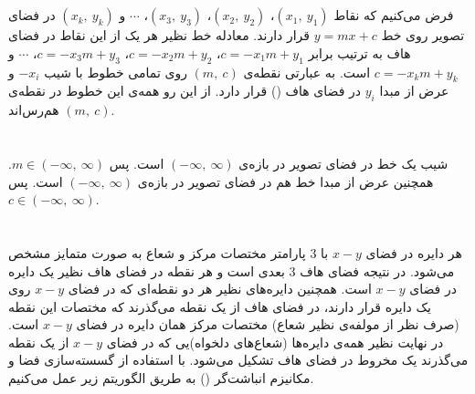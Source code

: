 \documentclass{article}
\begin{document}


\newpage


\section{}%
فرض می‌کنیم که نقاط 
$(x_{1},\: y_{1})$، 
$(x_{2},\: y_{2})$، 
$(x_{3},\: y_{3})$، 
$\cdots $ و 
$(x_{k},\: y_{k})$ در فضای تصویر روی خط 
$y=mx+c$
قرار دارند. معادله خط نظیر هر یک از این نقاط در فضای هاف به ترتیب برابر 
$c = -x_{1}m + y_{1}$، 
$c = -x_{2}m + y_{2}$، 
$c = -x_{3}m + y_{3}$، 
$\cdots $ و 
$c = -x_{k}m + y_{k}$ 
است. به عبارتی نقطه‌ی $(m,\:c)$ روی تمامی خطوط با شیب $-x_{i}$ و عرض از مبدا $y_{i}$ در فضای هاف () قرار دارد. از این رو همه‌ی این خطوط در نقطه‌ی $(m,\:c)$ هم‌رس‌اند.


\section{}%
شیب یک خط در فضای تصویر در بازه‌ی $\left( -\infty ,\: \infty \right)$ است. پس 
$
m \in \left( -\infty ,\: \infty \right)
$.
همچنین عرض از مبدا خط هم در فضای تصویر در بازه‌ی $\left( -\infty ,\: \infty \right)$ است. پس 
$
c \in \left( -\infty ,\: \infty \right)
$.


\section{}%
هر دایره در فضای $x-y$ با 3 پارامتر مختصات مرکز و شعاع به صورت متمایز مشخص می‌شود. در نتیجه فضای هاف 3 بعدی است و هر نقطه در فضای هاف نظیر یک دایره در فضای $x-y$ است. همچنین دایره‌های نظیر هر دو نقطه‌ای که در فضای $x-y$ روی یک دایره قرار دارند، در فضای هاف از یک نقطه می‌گذرند که مختصات این نقطه (صرف نظر از مولفه‌ی نظیر شعاع) مختصات مرکز همان دایره در فضای $x-y$ است. در نهایت نظیر همه‌ی دایره‌ها (شعاع‌های دلخواه)یی که در فضای $x-y$ از یک نقطه می‌گذرند یک مخروط در فضای هاف تشکیل می‌شود. با استفاده از گسسته‌سازی فضا و مکانیزم انباشت‌گر () به طریق الگوریتم زیر عمل می‌کنیم.
\end{document}
